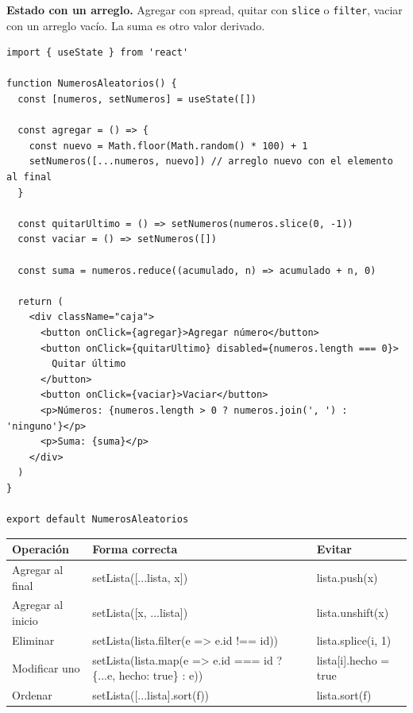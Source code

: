 \documentclass[11pt,a4paper]{article}
\newcommand{\cmd}[1]{\texttt{\color{reactdark}#1}}
\begin{document}
\textbf{Estado con un arreglo.} Agregar con spread, quitar con \cmd{slice} o \cmd{filter}, vaciar con un arreglo vacío. La suma es otro valor derivado.

\begin{lstlisting}[language=JSX,title={\small\ttfamily src/components/estado/NumerosAleatorios.jsx}]
import { useState } from 'react'

function NumerosAleatorios() {
  const [numeros, setNumeros] = useState([])

  const agregar = () => {
    const nuevo = Math.floor(Math.random() * 100) + 1
    setNumeros([...numeros, nuevo]) // arreglo nuevo con el elemento al final
  }

  const quitarUltimo = () => setNumeros(numeros.slice(0, -1))
  const vaciar = () => setNumeros([])

  const suma = numeros.reduce((acumulado, n) => acumulado + n, 0)

  return (
    <div className="caja">
      <button onClick={agregar}>Agregar número</button>
      <button onClick={quitarUltimo} disabled={numeros.length === 0}>
        Quitar último
      </button>
      <button onClick={vaciar}>Vaciar</button>
      <p>Números: {numeros.length > 0 ? numeros.join(', ') : 'ninguno'}</p>
      <p>Suma: {suma}</p>
    </div>
  )
}

export default NumerosAleatorios
\end{lstlisting}

\begin{center}
\small
\begin{tabular}{l >{\ttfamily}p{5.6cm} >{\ttfamily}p{4.2cm}}
\toprule
\textbf{Operación} & \textrm{\textbf{Forma correcta}} & \textrm{\textbf{Evitar}} \\
\midrule
Agregar al final & setLista([...lista, x]) & lista.push(x) \\
Agregar al inicio & setLista([x, ...lista]) & lista.unshift(x) \\
Eliminar & setLista(lista.filter(e => e.id !== id)) & lista.splice(i, 1) \\
Modificar uno & setLista(lista.map(e => e.id === id ? \{...e, hecho: true\} : e)) & lista[i].hecho = true \\
Ordenar & setLista([...lista].sort(f)) & lista.sort(f) \\
\bottomrule
\end{tabular}
\end{center}

\end{document}
